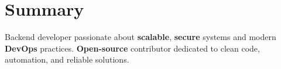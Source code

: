 \section{Summary}

\begin{onecolentry}
	Backend developer passionate about \textbf{scalable}, \textbf{secure} systems and modern
	\textbf{DevOps} practices. \textbf{Open-source} contributor dedicated to clean code, automation, and
	reliable solutions.
\end{onecolentry}
